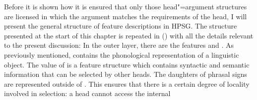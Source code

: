 Before it is shown how it is ensured that only those head"=argument structures are licensed in which the argument matches the requirements of the head, I will
present the general structure of feature descriptions in HPSG. The structure presented at the start of this chapter is repeated in () with all the details
relevant to the present discussion:
\ea
\label{LE-Grammatik}
\z
In the outer layer, there are the features \phon and \synsem. As previously mentioned, \phon contains the phonological representation of a linguistic
object. The value of \synsem is a feature structure which contains syntactic and semantic information that can be selected by other heads.
The daughters of phrasal signs are represented outside of \synsem. This ensures that there is a
certain degree of locality involved in selection: a head cannot access the internal
